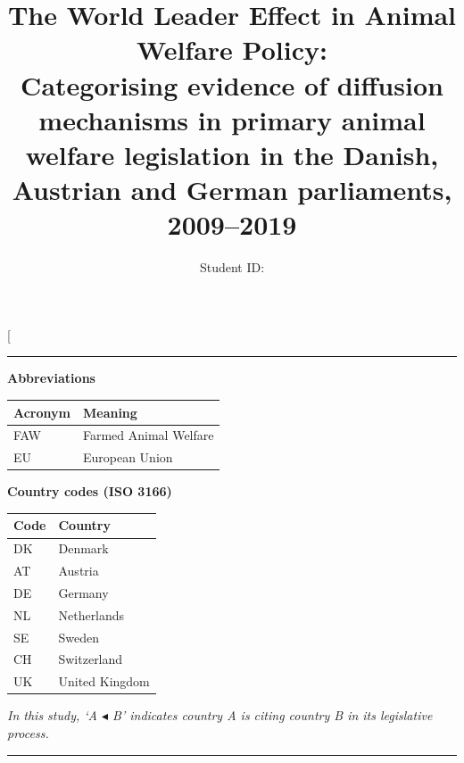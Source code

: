 \documentclass[twocolumn, 10pt, a4paper]{article}
\title{\textbf{The World Leader Effect in Animal Welfare Policy:}\\
  \large Categorising evidence of diffusion mechanisms in primary animal welfare
  legislation in the Danish, Austrian and German parliaments, 2009--2019}
\author{Student ID: \studentid \quad \LIS}
\date{\thesubdate}
\begin{document}

\twocolumn[{%
\begin{@twocolumnfalse}

\maketitle
\vspace{-0.5em}
\hrule
\vspace{0.8em}

\begin{minipage}[t]{0.45\textwidth}
\textbf{Abbreviations}\\[4pt]
\begin{tabular}{ll}
\toprule
Acronym & Meaning \\
\midrule
FAW & Farmed Animal Welfare \\
EU  & European Union \\
\bottomrule
\end{tabular}
\end{minipage}%
\hfill
\begin{minipage}[t]{0.45\textwidth}
\textbf{Country codes (ISO 3166)}\\[4pt]
\begin{tabular}{ll}
\toprule
Code & Country \\
\midrule
DK & Denmark \\
AT & Austria \\
DE & Germany \\
NL & Netherlands \\
SE & Sweden \\
CH & Switzerland \\
UK & United Kingdom \\
\bottomrule
\end{tabular}
\end{minipage}

\vspace{0.6em}
\noindent\small\textit{In this study, `A $\blacktriangleleft$ B' indicates country A is citing country B in its legislative process.}
\vspace{0.6em}
\hrule
\vspace{0.8em}


\end{@twocolumnfalse}}
\end{document}
